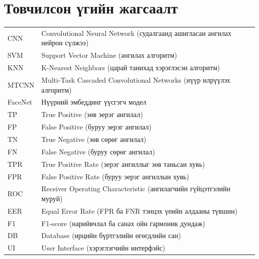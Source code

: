 \thispagestyle{plain}
\chapter*{Товчилсон үгийн жагсаалт}
\begin{tabular}{@{}p{3cm}p{12cm}@{}}
CNN & Convolutional Neural Network (судалгаанд ашигласан ангилах нейрон сүлжээ) \\
SVM & Support Vector Machine (ангилах алгоритм) \\
KNN & K-Nearest Neighbors (царай танихад хэрэглэсэн алгоритм) \\
MTCNN & Multi-Task Cascaded Convolutional Networks (нүүр илрүүлэх алгоритм) \\
FaceNet & Нүүрний эмбеддинг үүсгэгч модел \\
TP & True Positive (зөв эерэг ангилал) \\
FP & False Positive (буруу эерэг ангилал) \\
TN & True Negative (зөв сөрөг ангилал) \\
FN & False Negative (буруу сөрөг ангилал) \\
TPR & True Positive Rate (эерэг ангиллыг зөв таньсан хувь) \\
FPR & False Positive Rate (буруу эерэг ангиллын хувь) \\
ROC & Receiver Operating Characteristic (ангилагчийн гүйцэтгэлийн муруй) \\
EER & Equal Error Rate (FPR ба FNR тэнцэх үеийн алдааны түвшин) \\
F1 & F1-score (нарийвчлал ба санах ойн гармоник дундаж) \\
DB & Database (ирцийн бүртгэлийн өгөгдлийн сан) \\
UI & User Interface (хэрэглэгчийн интерфэйс) \\
\end{tabular}
